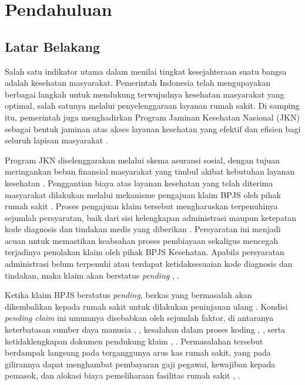 \pagestyle{halamanisi}
\chapter{Pendahuluan}

\section{Latar Belakang}
Salah satu indikator utama dalam menilai tingkat kesejahteraan suatu bangsa adalah kesehatan masyarakat. Pemerintah Indonesia telah mengupayakan berbagai langkah untuk mendukung terwujudnya kesehatan masyarakat yang optimal, salah satunya melalui penyelenggaraan layanan rumah sakit. Di samping itu, pemerintah juga menghadirkan Program Jaminan Kesehatan Nasional (JKN) sebagai bentuk jaminan atas akses layanan kesehatan yang efektif dan efisien bagi seluruh lapisan masyarakat \cite{10}.

Program JKN diselenggarakan melalui skema asuransi sosial, dengan tujuan meringankan beban finansial masyarakat yang timbul akibat kebutuhan layanan kesehatan \cite{10}. Penggantian biaya atas layanan kesehatan yang telah diterima masyarakat dilakukan melalui mekanisme pengajuan klaim BPJS oleh pihak rumah sakit \cite{1}. Proses pengajuan klaim tersebut mengharuskan terpenuhinya sejumlah persyaratan, baik dari sisi kelengkapan administrasi maupun ketepatan kode diagnosis dan tindakan medis yang diberikan \cite{1}. Persyaratan ini menjadi acuan untuk memastikan keabsahan proses pembiayaan sekaligus mencegah terjadinya penolakan klaim oleh pihak BPJS Kesehatan. Apabila persyaratan administrasi belum terpenuhi atau terdapat ketidaksesuaian kode diagnosis dan tindakan, maka klaim akan berstatus \textit{pending} \cite{10}, \cite{14}.

Ketika klaim BPJS berstatus \textit{pending}, berkas yang bermasalah akan dikembalikan kepada rumah sakit untuk dilakukan peninjauan ulang \cite{14}. Kondisi \textit{pending claim} ini umumnya disebabkan oleh sejumlah faktor, di antaranya keterbatasan sumber daya manusia \cite{10}, \cite{14}, kesalahan dalam proses koding \cite{10}, \cite{16}, serta ketidaklengkapan dokumen pendukung klaim \cite{10}, \cite{16}. Permasalahan tersebut berdampak langsung pada terganggunya arus kas rumah sakit, yang pada gilirannya dapat menghambat pembayaran gaji pegawai, kewajiban kepada pemasok, dan alokasi biaya pemeliharaan fasilitas rumah sakit \cite{10}, \cite{14}.

